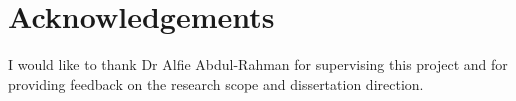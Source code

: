 \section*{Acknowledgements}

I would like to thank Dr Alfie Abdul-Rahman for supervising this project and for providing feedback on the research scope and dissertation direction.

\clearpage
